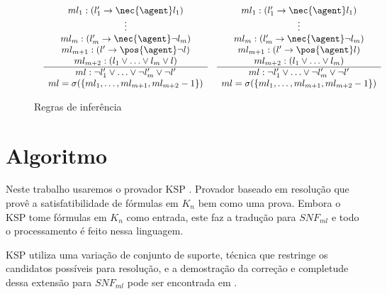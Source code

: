\begin{figure*}[t]
\[\begin{array}{c}
\begin{array}{ll}
	\begin{array}{c}
	ml_1: (l_1' \rightarrow \nec{\agent} l_1) \\
	\vdots \\
	ml_m: (l_m' \rightarrow \nec{\agent} \neg l_m) \\
	ml_{m+1}: (l' \rightarrow \pos{\agent} \neg l) \\
	ml_{m+2}: (l_1 \lor \ldots \lor l_m \lor l) \\
	\hline
	ml: \neg l_1' \lor \ldots \lor \neg l_m' \lor \neg l' \\
	ml = \sigma(\{ml_1, \ldots, ml_{m+1}, ml_{m+2}-1\}) \\
	\end{array}
	&
	\begin{array}{c}
	ml_1: (l_1' \rightarrow \nec{\agent} l_1) \\
	\vdots \\
	ml_m: (l_m' \rightarrow \nec{\agent} \neg l_m) \\
	ml_{m+1}: (l' \rightarrow \pos{\agent} l) \\
	ml_{m+2}: (l_1 \lor \ldots \lor l_m) \\
	\hline
	ml: \neg l_1' \lor \ldots \lor \neg l_m' \lor \neg l' \\
	ml = \sigma(\{ml_1, \ldots, ml_{m+1}, ml_{m+2}-1\}) \\
	\end{array}
	
	\\ \end{array} \\
	\end{array} 
	\]
	\caption{Regras de inferência}
	\label{figura:regrasinf}
\end{figure*}



\section{Algoritmo}
Neste trabalho usaremos o provador KSP \cite{Nalon2020}. Provador baseado em resolução que provê a satisfatibilidade de fórmulas em $K_n$ bem como uma prova. Embora o KSP tome fórmulas em $K_n$ como entrada, este faz a tradução para $SNF_{ml}$ e todo o processamento é feito nessa linguagem.

KSP utiliza uma variação de conjunto de suporte, técnica que restringe os candidatos possíveis para resolução, e a demostração da correção e completude dessa extensão para $SNF_{ml}$ pode ser encontrada em \cite{nalontocl}.

